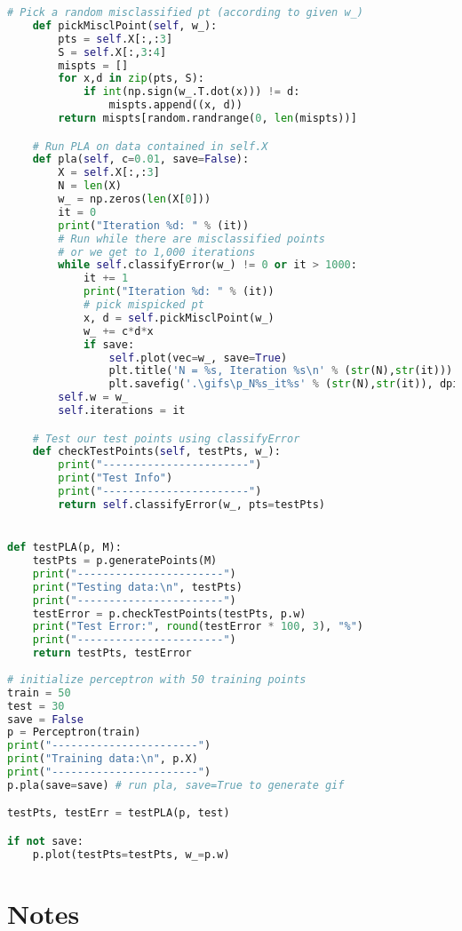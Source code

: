 \documentclass{article}
\begin{document}
\begin{lstlisting}[language=Python,breaklines=true]
    # Pick a random misclassified pt (according to given w_)
    def pickMisclPoint(self, w_):
        pts = self.X[:,:3]
        S = self.X[:,3:4]
        mispts = []
        for x,d in zip(pts, S):
            if int(np.sign(w_.T.dot(x))) != d:
                mispts.append((x, d))
        return mispts[random.randrange(0, len(mispts))]

    # Run PLA on data contained in self.X
    def pla(self, c=0.01, save=False):
        X = self.X[:,:3]
        N = len(X)
        w_ = np.zeros(len(X[0]))
        it = 0
        print("Iteration %d: " % (it))
        # Run while there are misclassified points
        # or we get to 1,000 iterations
        while self.classifyError(w_) != 0 or it > 1000:
            it += 1
            print("Iteration %d: " % (it))
            # pick mispicked pt
            x, d = self.pickMisclPoint(w_)
            w_ += c*d*x
            if save:
                self.plot(vec=w_, save=True)
                plt.title('N = %s, Iteration %s\n' % (str(N),str(it)))
                plt.savefig('.\gifs\p_N%s_it%s' % (str(N),str(it)), dpi=100, bbox_inches='tight')
        self.w = w_
        self.iterations = it

    # Test our test points using classifyError
    def checkTestPoints(self, testPts, w_):
        print("-----------------------")
        print("Test Info")
        print("-----------------------")
        return self.classifyError(w_, pts=testPts)


def testPLA(p, M):
    testPts = p.generatePoints(M)
    print("-----------------------")
    print("Testing data:\n", testPts)
    print("-----------------------")
    testError = p.checkTestPoints(testPts, p.w)
    print("Test Error:", round(testError * 100, 3), "%")
    print("-----------------------")
    return testPts, testError
    
# initialize perceptron with 50 training points
train = 50
test = 30
save = False
p = Perceptron(train)
print("-----------------------")
print("Training data:\n", p.X)
print("-----------------------")
p.pla(save=save) # run pla, save=True to generate gif

testPts, testErr = testPLA(p, test)

if not save:
    p.plot(testPts=testPts, w_=p.w)


\end{lstlisting}
\section*{Notes}

\end{document}
